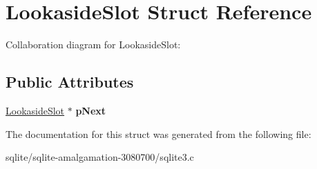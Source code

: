 \hypertarget{struct_lookaside_slot}{\section{Lookaside\+Slot Struct Reference}
\label{struct_lookaside_slot}
}


Collaboration diagram for Lookaside\+Slot\+:
\subsection*{Public Attributes}
\begin{DoxyCompactItemize}
\item 
\hypertarget{struct_lookaside_slot_a3c3dd4a770ded51a68e8a651eba40f66}{\hyperlink{struct_lookaside_slot}{Lookaside\+Slot} $\ast$ {\bfseries p\+Next}}\label{struct_lookaside_slot_a3c3dd4a770ded51a68e8a651eba40f66}

\end{DoxyCompactItemize}


The documentation for this struct was generated from the following file\+:\begin{DoxyCompactItemize}
\item 
sqlite/sqlite-\/amalgamation-\/3080700/sqlite3.\+c\end{DoxyCompactItemize}
